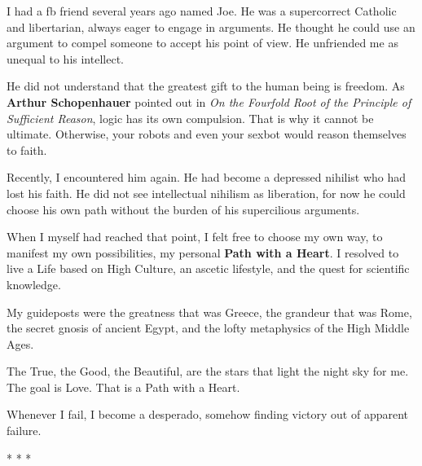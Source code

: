 I had a fb friend several years ago named Joe. He was a supercorrect Catholic and libertarian, always eager to engage in arguments. He thought he could use an argument to compel someone to accept his point of view. He unfriended me as unequal to his intellect.

He did not understand that the greatest gift to the human being is freedom. As \textbf{Arthur Schopenhauer} pointed out in \emph{On the Fourfold Root of the Principle of Sufficient Reason}, logic has its own compulsion. That is why it cannot be ultimate. Otherwise, your robots and even your sexbot would reason themselves to faith.

Recently, I encountered him again. He had become a depressed nihilist who had lost his faith. He did not see intellectual nihilism as liberation, for now he could choose his own path without the burden of his supercilious arguments.

When I myself had reached that point, I felt free to choose my own way, to manifest my own possibilities, my personal \textbf{Path with a Heart}. I resolved to live a Life based on High Culture, an ascetic lifestyle, and the quest for scientific knowledge.

My guideposts were the greatness that was Greece, the grandeur that was Rome, the secret gnosis of ancient Egypt, and the lofty metaphysics of the High Middle Ages.

The True, the Good, the Beautiful, are the stars that light the night sky for me. The goal is Love. That is a Path with a Heart.

Whenever I fail, I become a desperado, somehow finding victory out of apparent failure.



\begin{center}* * *\end{center}

